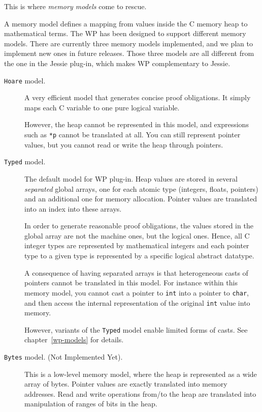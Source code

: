 This is where \emph{memory models} come to rescue.

A memory model defines a mapping from values inside the \textsf{C} memory
heap to mathematical terms. The \textsf{WP} has been designed to support
different memory models. There are currently three memory models
implemented, and we plan to implement new ones in future releases.
Those three models are all different from the one in the \textsf{Jessie}
plug-in, which makes \textsf{WP} complementary to \textsf{Jessie}.

\begin{description}

\item[\texttt{Hoare} model.]  A very efficient model that generates
  concise proof obligations. It simply maps each \textsf{C} variable to one
  pure logical variable.\par

  However, the heap cannot be represented in this model, and
  expressions such as \texttt{*p} cannot be translated at all. You
  can still represent pointer values, but you cannot read or write
  the heap through pointers.

\item[\texttt{Typed} model.] The default model for \textsf{WP}
  plug-in. Heap values are stored in several \emph{separated} global
  arrays, one for each atomic type (integers, floats, pointers) and
  an additional one for memory allocation. Pointer values are translated
  into an index into these arrays.\par

  In order to generate reasonable proof obligations, the values stored
  in the global array are not the machine ones, but the logical
  ones. Hence, all \textsf{C} integer types are represented by
  mathematical integers and each pointer type to a given type is represented
  by a specific logical abstract datatype.\par

  A consequence of having separated arrays is that heterogeneous casts
  of pointers cannot be translated in this model. For instance within
  this memory model, you cannot cast a pointer to \texttt{int} into a
  pointer to \texttt{char}, and then access the internal
  representation of the original \texttt{int} value into memory.

  However, variants of the \texttt{Typed} model enable limited forms of casts.
  See chapter~\ref{wp-models} for details.

\item[\texttt{Bytes} model. (Not Implemented Yet).] This is a
  low-level memory model, where the heap is represented as a wide
  array of bytes. Pointer values are exactly translated into memory
  addresses. Read and write operations from/to the heap are translated
  into manipulation of ranges of bits in the heap.\par


\end{description}
